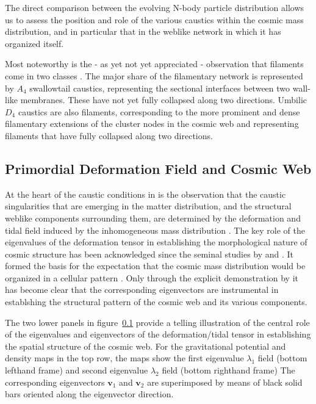 \documentclass[a4paper, 11pt]{article}
\begin{document}
The direct comparison between the evolving N-body particle distribution
allows us to assess the position and role of the various caustics
within the cosmic mass distribution, and in particular that in the
weblike network in which it has organized itself.


Most noteworthy is the - as yet not yet appreciated -
observation that filaments come in two classes \citep{feldbrugge2019}.
The major share of the filamentary network is represented by
$A_4$ swallowtail caustics, representing the sectional interfaces
between two wall-like membranes. These have not yet fully collapsed along
two directions. Umbilic $D_4$ caustics are also filaments, corresponding
to the more prominent and dense filamentary extensions of the cluster
nodes in the cosmic web and representing filaments that have fully
collapsed along two directions.








\subsection{Primordial Deformation Field and Cosmic Web}
At the heart of the caustic conditions in \citep{feldbrugge2019} is the
observation that the caustic singularities that
are emerging in the matter distribution, and the structural weblike
components surrounding them, are determined by
the deformation and tidal field induced by the inhomogeneous mass
distribution \citep{zeldovich1970,weyedb1996,weybond2008,
   hidding2014}. The key role of the eigenvalues of the deformation
tensor in establishing the morphological
nature of cosmic structure has been acknowledged since the seminal
studies by \cite{zeldovich1970} and \cite{doroshkevich1970}.
It formed the basis for the expectation that the cosmic mass
distribution would be organized in a cellular pattern
\citep[also see]{shandzeld1989,sunyshand2014}. Only through the explicit
demonstration by \cite{feldbrugge2019} it has
become clear that the corresponding eigenvectors are instrumental in
establshing the structural pattern of the
cosmic web and its various components.

The two lower panels in figure~\ref{} provide a telling illustration of
the central role of the eigenvalues and
eigenvectors of the deformation/tidal tensor in establishing the spatial
structure of the cosmic web.
For the gravitational potential and density maps in the top row, the
maps show the first eigenvalue $\lambda_1$ field
(bottom lefthand frame) and second eigenvalue $\lambda_2$ field (bottom
righthand frame)  The corresponding
eigenvectors $\bm{v}_1$ and $\bm{v}_2$ are superimposed by means of
black solid bars oriented along the eigenvector
direction.
\end{document}
